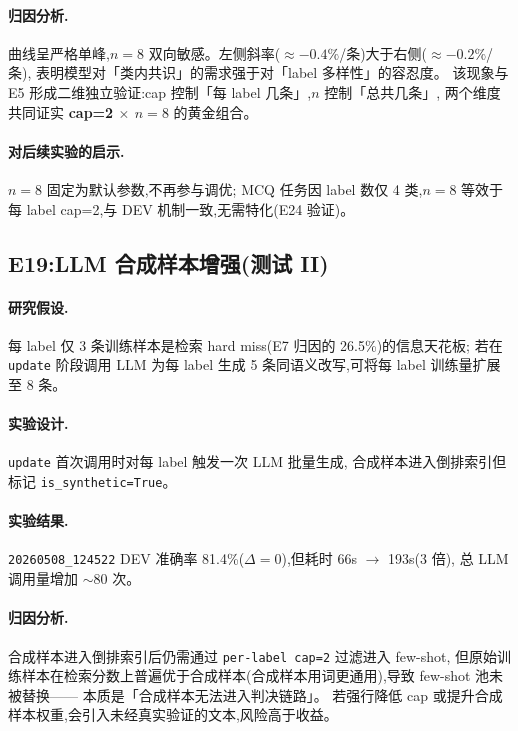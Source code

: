 \documentclass[11pt,a4paper]{ctexart}
\begin{document}
\paragraph{归因分析.}曲线呈严格单峰,$n=8$ 双向敏感。左侧斜率($\approx -0.4\%$/条)大于右侧($\approx -0.2\%$/条),
表明模型对「类内共识」的需求强于对「label 多样性」的容忍度。
该现象与 E5 形成二维独立验证:cap 控制「每 label 几条」,$n$ 控制「总共几条」,
两个维度共同证实 \textbf{cap=2 $\times$ $n=8$} 的黄金组合。

\paragraph{对后续实验的启示.}$n=8$ 固定为默认参数,不再参与调优;
MCQ 任务因 label 数仅 4 类,$n=8$ 等效于每 label cap=2,与 DEV 机制一致,无需特化(E24 验证)。

\subsection{E19:LLM 合成样本增强(测试 II)}

\paragraph{研究假设.}每 label 仅 3 条训练样本是检索 hard miss(E7 归因的 26.5\%)的信息天花板;
若在 \texttt{update} 阶段调用 LLM 为每 label 生成 5 条同语义改写,可将每 label 训练量扩展至 8 条。

\paragraph{实验设计.}\texttt{update} 首次调用时对每 label 触发一次 LLM 批量生成,
合成样本进入倒排索引但标记 \texttt{is\_synthetic=True}。

\paragraph{实验结果.}\texttt{20260508\_124522} DEV 准确率 81.4\%($\Delta = 0$),但耗时 66s $\to$ 193s(3 倍),
总 LLM 调用量增加 $\sim 80$ 次。

\paragraph{归因分析.}合成样本进入倒排索引后仍需通过 \texttt{per-label cap=2} 过滤进入 few-shot,
但原始训练样本在检索分数上普遍优于合成样本(合成样本用词更通用),导致 few-shot 池未被替换——
本质是「合成样本无法进入判决链路」。
若强行降低 cap 或提升合成样本权重,会引入未经真实验证的文本,风险高于收益。
\end{document}
